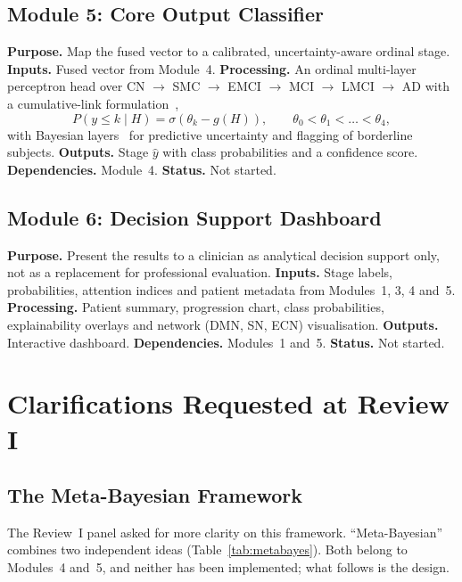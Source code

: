 \documentclass{ssnreview}
\begin{document}
\subsection{Module 5: Core Output Classifier}
\textbf{Purpose.} Map the fused vector to a calibrated, uncertainty-aware ordinal stage.
\textbf{Inputs.} Fused vector from Module~4. \textbf{Processing.} An ordinal multi-layer
perceptron head over CN $\rightarrow$ SMC $\rightarrow$ EMCI $\rightarrow$ MCI
$\rightarrow$ LMCI $\rightarrow$ AD with a cumulative-link formulation~\cite{mccullagh1980},
\begin{equation}
  P(y \le k \mid H) = \sigma\!\left(\theta_k - g(H)\right), \qquad
  \theta_0 < \theta_1 < \dots < \theta_4,
\end{equation}
with Bayesian layers~\cite{gal2016} for predictive uncertainty and flagging of
borderline subjects. \textbf{Outputs.} Stage $\hat{y}$ with class probabilities and a
confidence score. \textbf{Dependencies.} Module~4. \textbf{Status.} Not started.

\subsection{Module 6: Decision Support Dashboard}
\textbf{Purpose.} Present the results to a clinician as analytical decision support
only, not as a replacement for professional evaluation. \textbf{Inputs.} Stage labels,
probabilities, attention indices and patient metadata from Modules~1, 3, 4 and~5.
\textbf{Processing.} Patient summary, progression chart, class probabilities,
explainability overlays and network (DMN, SN, ECN) visualisation. \textbf{Outputs.}
Interactive dashboard. \textbf{Dependencies.} Modules~1 and~5. \textbf{Status.} Not
started.

\section{Clarifications Requested at Review I}

\subsection{The Meta-Bayesian Framework}\label{sec:metabayes}

The Review~I panel asked for more clarity on this framework. ``Meta-Bayesian'' combines
two independent ideas (Table~\ref{tab:metabayes}). Both belong to Modules~4 and~5, and
neither has been implemented; what follows is the design.
\end{document}
